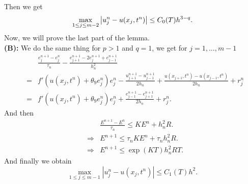 \documentclass[a4paper,12pt,english,reqno]{smfart}
\begin{document}
	
	
	Then we get
	\begin{equation*}
	\max_{1\leq j \leq m-2}\left|u_{j}^{n}-u(x_{j},t^{n})\right|\leq C_{0}(T)h^{3-q}.\\
	\end{equation*}
	Now, we will prove the last part of the lemma.\\
	\textbf{(B):} We do the same thing for $p>1$ and $q=1$, we get for $j=1,...,m-1$
	\begin{eqnarray*}
		&&\frac{e_{j}^{n+1}-e_{j}^{n}}{\tau_{n}}-\frac{e_{j+1}^{n+1}-2e_{j}^{n+1}+e_{j-1}^{n+1}}{h_{n}^{2}}\\
		&=&f'(u(x_{j},t^{n})+\theta_{9}e_{j}^{n})e_{j}^{n}-\frac{u_{j+1}^{n+1}-u_{j-1}^{n+1}}{2h_{n}}+\frac{u(x_{j+1},t^{n})-u(x_{j-1},t^{n})}{2h_{n}}+r_{j}^{n}\\
		&=&f'(u(x_{j},t^{n})+\theta_{9}e_{j}^{n})e_{j}^{n}+\frac{e_{j-1}^{n+1}-e_{j+1}^{n+1}}{2h_{n}}+r_{j}^{n}.
	\end{eqnarray*}
	And then
	\begin{eqnarray*}
		&&\frac{E^{n+1}-E^{n}}{\tau_{n}}\leq KE^{n}+h_{n}^{2}R.\\
		&\Rightarrow& E^{n+1}\leq \tau_{n}KE^{n}+\tau_{n}h_{n}^{2}R.\\
		&\Rightarrow& E^{n+1}\leq \exp(KT)h_{n}^{2}RT.
	\end{eqnarray*}
	And finally we obtain
	\begin{equation*}
	\max_{1\leq j\leq m-1}\left|u_{j}^{n}-u(x_{j},t^{n})\right|\leq C_{1}(T)h^{2}.
	\end{equation*}
\end{document}
